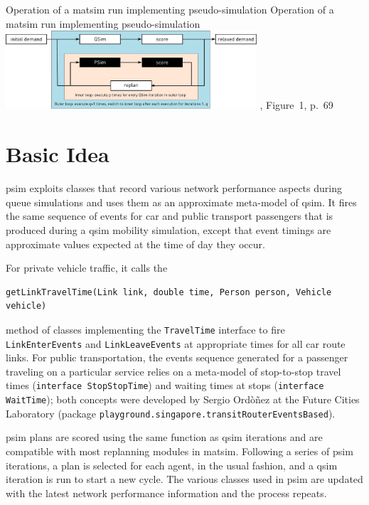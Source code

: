 \createfigure%
{Operation of a \protect\gls{matsim} run implementing pseudo-simulation}%
{Operation of a \protect\gls{matsim} run implementing pseudo-simulation}%
{\label{fig:PSim}}%
{\includegraphics[width=0.7\textwidth, angle=0]{extending/figures/PSim/psim.pdf}}%
{\citet[][]{FourieEtAl_TRR_2013}, Figure~1, p.~69}

\section{Basic Idea}
\gls{psim} exploits classes that record various network performance aspects during queue simulations and uses them as an approximate meta-model of \gls{qsim}. It fires the same sequence of events for car and public transport passengers that is produced during a \gls{qsim} mobility simulation, except that event timings are approximate values expected at the time of day they occur.

For private vehicle traffic, it calls the 
\begin{lstlisting}
getLinkTravelTime(Link link, double time, Person person, Vehicle vehicle)
\end{lstlisting}
method of classes implementing the \lstinline|TravelTime| interface to fire \lstinline|LinkEnterEvents| and \lstinline|LinkLeaveEvents| at appropriate times for all car route links. For public transportation, the events sequence generated for a passenger traveling on a particular service relies on a meta-model of stop-to-stop travel times (\lstinline|interface StopStopTime|) and waiting times at stops (\lstinline|interface WaitTime|); both concepts were developed by Sergio Ord\`o\~nez at the Future Cities Laboratory (package \lstinline|playground.singapore.transitRouterEventsBased|).

\gls{psim} plans are scored using the same function as  \gls{qsim} iterations and are compatible with most replanning modules in \gls{matsim}. Following a series of \gls{psim} iterations, a plan is selected for each agent, in the usual fashion, and a \gls{qsim} iteration is run to start a new cycle. The various classes used in \gls{psim} are updated with the latest network performance information and the process repeats.

